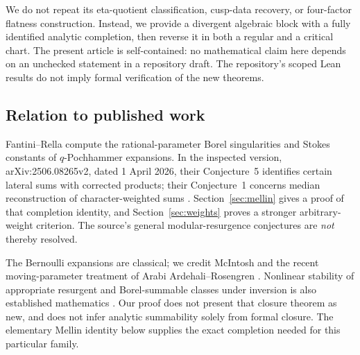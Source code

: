 \documentclass[11pt,a4paper]{article}
\numberwithin{equation}{section}
\theoremstyle{definition}
\theoremstyle{remark}\newtheorem{remark}[theorem]{Remark}
\begin{document}
We do not repeat its eta-quotient classification, cusp-data recovery, or
four-factor flatness construction. Instead, we provide a divergent
algebraic block with a fully identified analytic completion, then reverse
it in both a regular and a critical chart. The present article is
self-contained: no mathematical claim here depends on an unchecked
statement in a repository draft. The repository's scoped Lean results
do not imply formal verification of the new theorems.

\subsection{Relation to published work}
Fantini--Rella compute the rational-parameter Borel singularities and
Stokes constants of $q$-Pochhammer expansions. In the inspected version,
arXiv:2506.08265v2, dated 1 April 2026, their Conjecture~5 identifies
certain lateral sums with corrected products; their Conjecture~1 concerns
median reconstruction of character-weighted sums \cite{fr}.
Section~\ref{sec:mellin} gives a proof of that completion identity, and
Section~\ref{sec:weights} proves a stronger arbitrary-weight criterion.
The source's general modular-resurgence conjectures are \emph{not}
thereby resolved.

The Bernoulli expansions are classical; we credit McIntosh and the recent
moving-parameter treatment of Arabi Ardehali--Rosengren
\cite{mcintosh,ar}. Nonlinear stability of appropriate resurgent and
Borel-summable classes under inversion is also established mathematics
\cite{sauzin,sauzinintro}. Our proof does not present that closure theorem
as new, and does not infer analytic summability solely from formal
closure. The elementary Mellin identity below supplies the exact
completion needed for this particular family.
\end{document}
